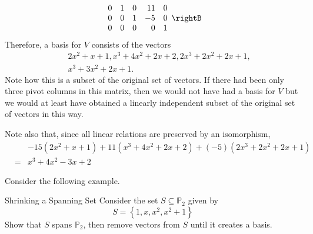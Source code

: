 \begin{solution}
\begin{equation*}
\begin{array}{rrrrr}
0 & 1 & 0 & 11 & 0 \\ 
0 & 0 & 1 & -5 & 0 \\ 
0 & 0 & 0 & 0 & 1
\end{array}
\rightB
\end{equation*}
Therefore, a basis for $V$ consists of the vectors
\begin{eqnarray*}
&&2x^{2}+x+1,x^{3}+4x^{2}+2x+2,2x^{3}+2x^{2}+2x+1, \\
&&x^{3}+3x^{2}+2x+1.
\end{eqnarray*}
Note how this is a subset of the original set of vectors. If there had been
only three pivot columns in this matrix, then we would not have had a basis
for $V$ but we would at least have obtained a linearly independent subset of
the original set of vectors in this way. 

Note also that, since all linear relations are preserved by an isomorphism,
\begin{eqnarray*}
&&-15\left( 2x^{2}+x+1\right) +11\left( x^{3}+4x^{2}+2x+2\right) +\left(
-5\right) \left( 2x^{3}+2x^{2}+2x+1\right) \\
&=&x^{3}+4x^{2}-3x+2
\end{eqnarray*}

\end{solution}

Consider the following example.

\begin{example}{Shrinking a Spanning Set}\label{exa:shrinkspanning}
Consider the set $S \subseteq \mathbb{P}_2$ given by 
\[
S = \left\{ 1, x, x^2, x^2 + 1 \right\}
\]
Show that $S$ spans $\mathbb{P}_2$, then remove vectors from $S$ until it creates a basis. 
\end{example}

